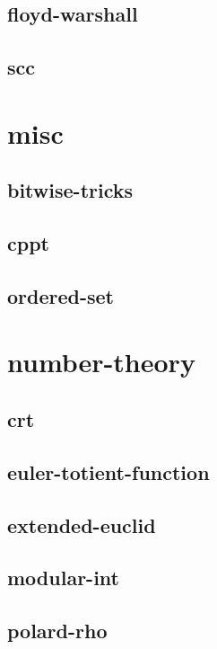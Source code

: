 \documentclass[a4paper, twocolumn]{article}
\begin{document}
\subsection{floyd-warshall}

\subsection{scc}

\section{misc}
\subsection{bitwise-tricks}

\subsection{cppt}

\subsection{ordered-set}

\section{number-theory}
\subsection{crt}

\subsection{euler-totient-function}

\subsection{extended-euclid}

\subsection{modular-int}

\subsection{polard-rho}

\end{document}
